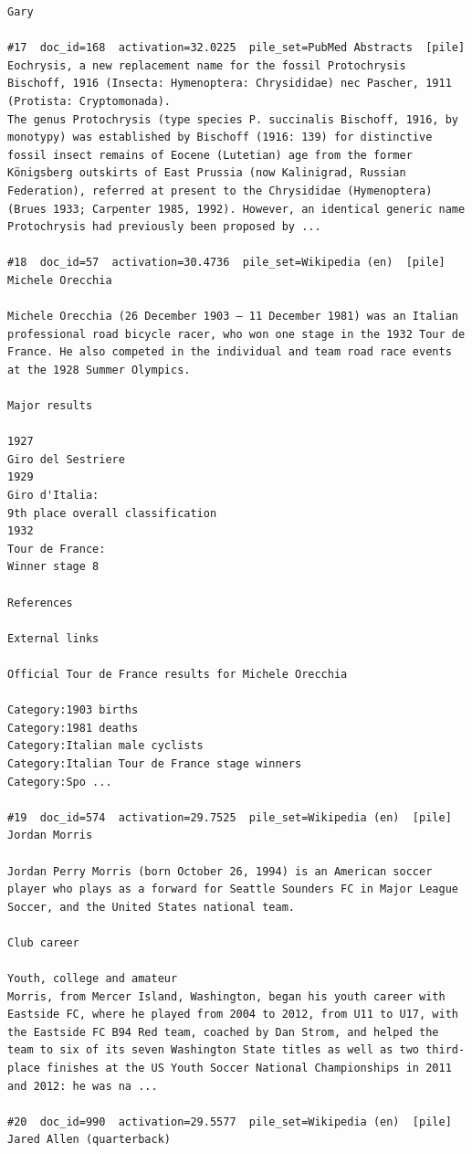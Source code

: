 \begin{verbatim}
Gary

#17  doc_id=168  activation=32.0225  pile_set=PubMed Abstracts  [pile]
Eochrysis, a new replacement name for the fossil Protochrysis Bischoff, 1916 (Insecta: Hymenoptera: Chrysididae) nec Pascher, 1911 (Protista: Cryptomonada).
The genus Protochrysis (type species P. succinalis Bischoff, 1916, by monotypy) was established by Bischoff (1916: 139) for distinctive fossil insect remains of Eocene (Lutetian) age from the former Königsberg outskirts of East Prussia (now Kalinigrad, Russian Federation), referred at present to the Chrysididae (Hymenoptera) (Brues 1933; Carpenter 1985, 1992). However, an identical generic name Protochrysis had previously been proposed by ...

#18  doc_id=57  activation=30.4736  pile_set=Wikipedia (en)  [pile]
Michele Orecchia

Michele Orecchia (26 December 1903 – 11 December 1981) was an Italian professional road bicycle racer, who won one stage in the 1932 Tour de France. He also competed in the individual and team road race events at the 1928 Summer Olympics.

Major results

1927
Giro del Sestriere
1929
Giro d'Italia:
9th place overall classification
1932
Tour de France:
Winner stage 8

References

External links

Official Tour de France results for Michele Orecchia

Category:1903 births
Category:1981 deaths
Category:Italian male cyclists
Category:Italian Tour de France stage winners
Category:Spo ...

#19  doc_id=574  activation=29.7525  pile_set=Wikipedia (en)  [pile]
Jordan Morris

Jordan Perry Morris (born October 26, 1994) is an American soccer player who plays as a forward for Seattle Sounders FC in Major League Soccer, and the United States national team.

Club career

Youth, college and amateur
Morris, from Mercer Island, Washington, began his youth career with Eastside FC, where he played from 2004 to 2012, from U11 to U17, with the Eastside FC B94 Red team, coached by Dan Strom, and helped the team to six of its seven Washington State titles as well as two third-place finishes at the US Youth Soccer National Championships in 2011 and 2012: he was na ...

#20  doc_id=990  activation=29.5577  pile_set=Wikipedia (en)  [pile]
Jared Allen (quarterback)


\end{verbatim}
